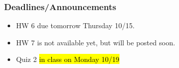 
\begin{frame}
    \frametitle{Deadlines/Announcements}
\begin{itemize}
            \item HW 6 due tomorrow Thursday 10/15.
            \item HW 7 is not available yet, but will be posted soon.
            \item Quiz 2 \hl{in class on Monday 10/19} %
        \end{itemize}
\end{frame}
